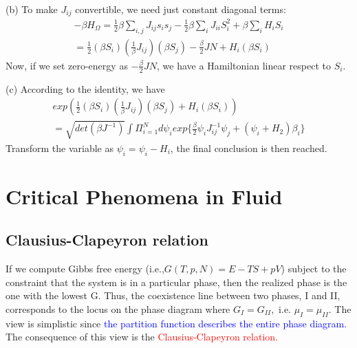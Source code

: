 \documentclass[12pt,titlepage]{article}
\newcommand{\redp}[1]{\textcolor{red}{#1}}
\newcommand{\bluep}[1]{\textcolor{blue}{#1}}
\numberwithin{equation}{section}
\begin{document}
(b)
To make $J_{ij}$ convertible, we need just constant diagonal terms:
\begin{align*}
    -\beta H_{\Omega}=\frac{1}{2} \beta \sum_{i, j} J_{i j} s_{i} s_{j}-\frac{1}{2}\beta \sum_{i}J_{ii}S_i^2+\beta\sum_iH_iS_i\\=\frac{1}{2}\left(\beta S_{i}\right)\left(\frac{1}{\beta} J_{ij}\right)\left(\beta S_{j}\right)-\frac{\beta}{2} J N+H_{i}\left(\beta S_{i}\right)
\end{align*}
Now, if we set zero-energy as $-\frac{\beta}{2} J N$, we have a Hamiltonian linear respect to $S_i$.

(c) According to the identity, we have
\begin{align*}
    exp(\frac{1}{2}\left(\beta S_{i}\right)\left(\frac{1}{\beta} J_{ij}\right)\left(\beta S_{j}\right)+H_{i}\left(\beta S_{i}\right))\\
    =\sqrt{det(\beta J^{-1})}\int\Pi^N_{i=1}d\psi_i exp\{\frac{\beta}{2}\psi_{i} J_{i j}^{-1} \psi_{j}+\left(\psi_{i}+H_{2}\right) \beta_{i}\}
\end{align*}
Transform the variable as $\psi_i=\psi_i-H_i$, the final conclusion is then reached.

\section{Critical Phenomena in Fluid}
\subsection{Clausius-Clapeyron relation}
If we compute Gibbs free energy (i.e.,$G(T,p,N)=E-TS+pV$) subject to the constraint that the system is in a particular phase, then the realized phase is the one with the lowest G. Thus, the coexistence line between two phases, I and II, corresponds to the locus on the phase diagram where $G_{I}=G_{I I},$ i.e. $\mu_{I}=\mu_{I I}$. The view is simplistic since \bluep{the partition function describes the entire phase diagram.} The consequence of this view is the \redp{Clausius-Clapeyron relation.}
\end{document}
